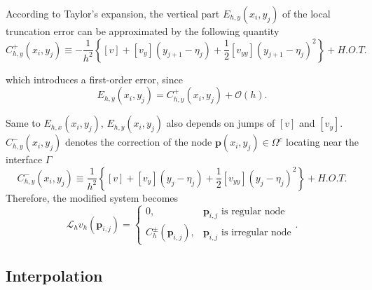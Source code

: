According to Taylor's expansion, the vertical part $E_{h, y}\left(x_{i}, y_{j}\right)$ of the local truncation error can be approximated by the following quantity
$$
C_{h, y}^{+}\left(x_{i}, y_{j}\right) \equiv -\frac{1}{h^{2}}\left\{[v]+\left[v_{y}\right]\left(y_{j+1}-\eta_{j}\right)+\frac{1}{2}\left[v_{y y}\right]\left(y_{j+1}-\eta_{j}\right)^{2}\right\} + H.O.T.
$$

which introduces a first-order error, since
$$
E_{h, y}\left(x_{i}, y_{j}\right)=C_{h, y}^{+}\left(x_{i}, y_{j}\right)+\mathcal{O}(h).
$$

Same to $E_{h, x}(x_{i}, y_{j})$, $E_{h, y}(x_{i}, y_{j})$ also depends on jumps of $[v]$ and $[v_{y}]$. $C^{-}_{h,y}(x_{i}, y_{j})$ denotes the correction of the node $\mathbf{p}(x_{i}, y_{j}) \in \Omega^{c}$ locating near the interface $\Gamma$
$$
C_{h, y}^{-}\left(x_{i}, y_{j}\right) \equiv \frac{1}{h^{2}}\left\{[v]+\left[v_{y}\right]\left(y_{j}-\eta_{j}\right)+\frac{1}{2}\left[v_{y y}\right]\left(y_{j}-\eta_{j}\right)^{2}\right\} + H.O.T.
$$
Therefore, the modified system becomes 
\begin{equation}
    \mathcal{L}_{h}v_{h}(\mathbf{p}_{i,j}) = \begin{cases}
    0, & \mathbf{p}_{i,j} \text{ is regular node} \\
    C^{\pm}_{h}(\mathbf{p}_{i,j}), & \mathbf{p}_{i,j} \text{ is irregular node} \end{cases}.
\end{equation}
\fi
\subsection{Interpolation} \label{one_GPU:interpolation}

